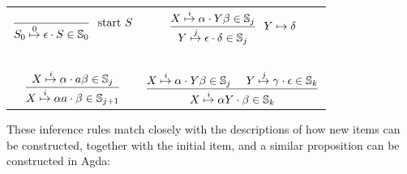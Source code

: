 		\begin{table}[h]
			\centering
			\begin{tabular}{cc}
				\( \displaystyle \frac{}
					{\earley{S_0}{\epsilon}{S}{0} \in \St{0}}
					~~\textrm{start } S
					\) &
				\( \displaystyle \frac
					{\earley{X}{\alpha}{Y\beta}{i} \in \St{j}}
					{\earley{Y}{\epsilon}{\delta}{j} \in \St{j}}
					~~Y \mapsto \delta
					\)
				\\~&~\\
				\( \displaystyle \frac
					{\earley{X}{\alpha}{a\beta}{i} \in \St{j}}
					{\earley{X}{\alpha a}{\beta}{i} \in \St{j+1}}
					\) &
				\( \displaystyle \frac
					{
						\earley{X}{\alpha}{Y\beta}{i} \in \St{j}~~~~
						\earley{Y}{\gamma}{\epsilon}{j} \in \St{k}
						}
					{\earley{X}{\alpha Y}{\beta}{i} \in \St{k}}
					\)
			\end{tabular}
		\end{table}


		These inference rules match closely with the descriptions of how new
		items can be constructed, together with the initial item, and a similar
		proposition can be constructed in Agda:

